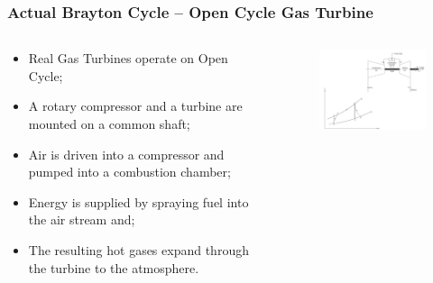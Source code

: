 \documentclass[10pt,compress]{beamer}
\begin{document}
\begin{frame}
 \frametitle{Actual Brayton Cycle -- Open Cycle Gas Turbine}
 \begin{columns}
  \begin{column}[c]{0.4\linewidth} 
 \begin{itemize}
  \item <1-> Real Gas Turbines operate on Open Cycle;
  \item <2-> A rotary compressor and a turbine are mounted on a common shaft;
  \item <3-> Air is driven into a compressor and pumped into a combustion chamber;
  \item <4-> Energy is supplied by spraying fuel into the air stream and;
  \item <5-> The resulting hot gases expand through the turbine to the atmosphere.
 \end{itemize}
  \end{column}
  \begin{column}[c]{0.6\linewidth}
    \begin{center}
   \begin{figure}%
     \includegraphics[height=6.cm,width=6.5cm,clip]{./Pics/Brayton_cycle3}
   \end{figure}  
    \end{center}
  \end{column}  
 \end{columns}

\end{frame}
\end{document}
